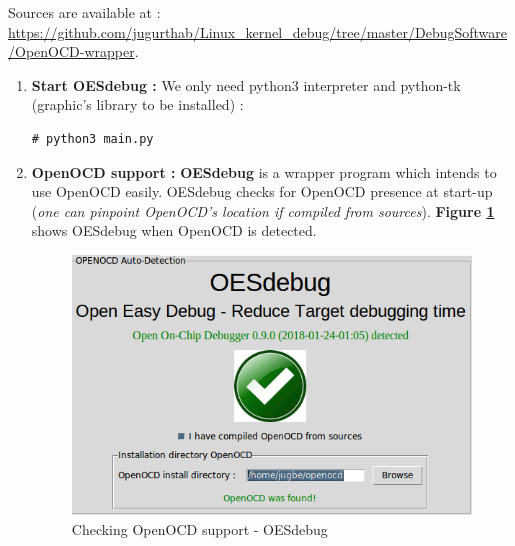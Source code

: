 \begin{enumerate}
\begin{center}
\begin{mdframed}[
        linecolor=red,linewidth=2pt,%
        frametitlerule=true,%
        apptotikzsetting={\tikzset{mdfframetitlebackground/.append style={%
            shade,left color=white, right color=blue!20}}}, 
        frametitlerulecolor=blue,
        frametitlerulewidth=1pt, innertopmargin=\topskip,
        frametitle={OESdebug sources},
        outerlinewidth=1.25pt
    ]
		Sources are available at : {\color{blue}\url{https://github.com/jugurthab/Linux_kernel_debug/tree/master/DebugSoftware/OpenOCD-wrapper}}.
\end{mdframed}
\end{center}

	
	
	\begin{enumerate}
		\item \textbf{Start OESdebug : } We only need python3 interpreter and python-tk (graphic's library to be installed) :
		\begin{lstlisting}[style=BashInputStyle]
# python3 main.py
	\end{lstlisting}	
			
	
		\item \textbf{OpenOCD support :} \textbf{OESdebug} is a wrapper program which intends to use OpenOCD easily. OESdebug checks for OpenOCD presence at start-up (\textit{one can pinpoint OpenOCD's location if compiled from sources}). \textbf{Figure \ref{Checking OpenOCD support - OESdebug}} shows OESdebug when OpenOCD is detected.		
		\begin{figure}[H]
			\centering
        	\includegraphics[scale=0.32]{img/solution/OESdebug-detect-OpenOCD.png}
        	\caption{Checking OpenOCD support - OESdebug}
        	\label{Checking OpenOCD support - OESdebug}
    	\end{figure}
		

\end{enumerate}
\end{enumerate}
